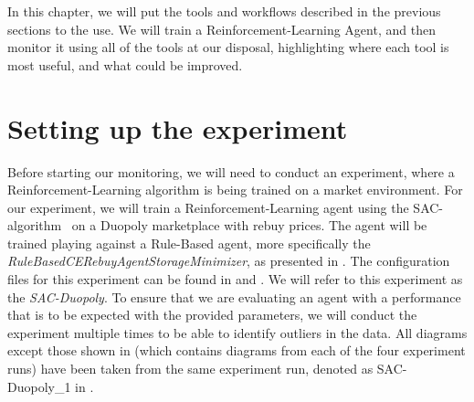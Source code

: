 \label{ch:AnalyzingGraphs}

\begin{jointwork}
	In this chapter, we will put the tools and workflows described in the previous sections to the use. We will train a Reinforcement-Learning Agent, and then monitor it using all of the tools at our disposal, highlighting where each tool is most useful, and what could be improved.
\end{jointwork}

\section*{Setting up the experiment}

Before starting our monitoring, we will need to conduct an experiment, where a Reinforcement-Learning algorithm is being trained on a market environment. For our experiment, we will train a Reinforcement-Learning agent using the SAC-algorithm~\cite{StableBaselines3SAC} on a Duopoly marketplace with rebuy prices. The agent will be trained playing against a Rule-Based agent, more specifically the \emph{RuleBasedCERebuyAgentStorageMinimizer}, as presented in . The configuration files for this experiment can be found in  and . We will refer to this experiment as the \emph{SAC-Duopoly}. To ensure that we are evaluating an agent with a performance that is to be expected with the provided parameters, we will conduct the experiment multiple times to be able to identify outliers in the data. All diagrams except those shown in  (which contains diagrams from each of the four experiment runs) have been taken from the same experiment run, denoted as SAC-Duopoly\_1 in .



